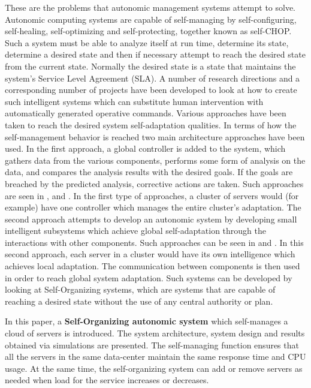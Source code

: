 \documentclass[conference]{IEEEtran}
\begin{document}
These are the problems that autonomic management systems attempt to solve. Autonomic computing systems are capable of self-managing by self-configuring, self-healing, self-optimizing and self-protecting, together known as self-CHOP. Such a system must be able to analyze itself at run time, determine its state, determine a desired state and then if necessary attempt to reach the desired state from the current state. Normally the desired state is a state that maintains the system's Service Level Agreement (SLA). A number of research directions and a corresponding number of projects have been developed to look at how to create such intelligent systems which can substitute human intervention with automatically generated operative commands. Various approaches have been taken to reach the desired system self-adaptation qualities. In terms of how the self-management behavior is reached two main architecture approaches have been used. In the first approach, a global controller is added to the system, which gathers data from the various components, performs some form of analysis on the data, and compares the analysis results with the desired goals. If the goals are breached by the predicted analysis, corrective actions are taken. Such approaches are seen in \cite{related:architecture:hierarch1}, \cite{related:model:lqm} and \cite{bogdan:seams07}. In the first type of approaches, a cluster of servers would (for example) have one controller which manages the entire cluster's adaptation. The second approach attempts to develop an autonomic system by developing small intelligent subsystems which achieve global self-adaptation through the interactions with other components. Such approaches can be seen in \cite{related:architecture:selflet} and \cite{related:architecture:unity}. In this second approach, each server in a cluster would have its own intelligence which achieves local adaptation. The communication between components is then used in order to reach global system adaptation. Such systems can be developed by looking at Self-Organizing systems, which are systems that are capable of reaching a desired state without the use of any central authority or plan.

In this paper, a \textbf{Self-Organizing autonomic system} which self-manages a cloud of servers is introduced. The system architecture, system design and results obtained via simulations are presented. The self-managing function ensures that all the servers in the same data-center maintain the same response time and CPU usage. At the same time, the self-organizing system can add or remove servers as needed when load for the service increases or decreases.
\end{document}
